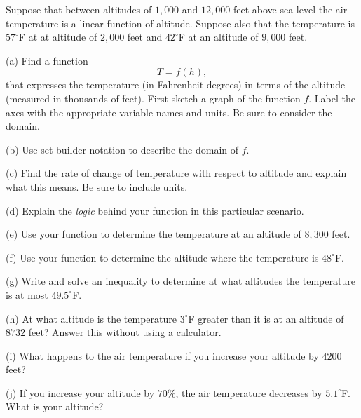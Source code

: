 \documentclass{ximera}
\begin{document}
\begin{question}   \label{Qdfsdfbbhhh}
Suppose that between altitudes of $1,000$ and $12,000$ feet above sea level the air temperature is a linear function of altitude. Suppose also that the temperature is $57^\circ$F at at altitude of $2,000$ feet and $42^\circ$F at an altitude of $9,000$ feet.

(a) Find a function
\[
    T = f(h) ,
\]
that expresses the temperature (in Fahrenheit degrees) in terms of the altitude (measured in thousands of feet). First sketch a graph of the function $f$. Label the axes with the appropriate variable names and units. Be sure to consider the domain.

(b) Use set-builder notation to describe the domain of $f$.

(c) Find the rate of change of temperature with respect to altitude and explain what this means. Be sure to include units.

(d) Explain the \emph{logic} behind your function in this particular scenario.

(e) Use your function to determine the temperature at an altitude of $8,300$ feet.

(f) Use your function to determine the altitude where the temperature is $48^\circ$F.

(g) Write and solve an inequality to determine at what altitudes the temperature is at most $49.5^\circ$F.

(h) At what altitude is the temperature $3^\circ$F greater than it is at an altitude of $8732$ feet? Answer this without using a calculator.

(i) What happens to the air temperature if you increase your altitude by $4200$ feet?

(j) If you increase your altitude by $70\%$, the air temperature decreases by $5.1^\circ$F. What is your altitude?

\end{question}
\end{document}
